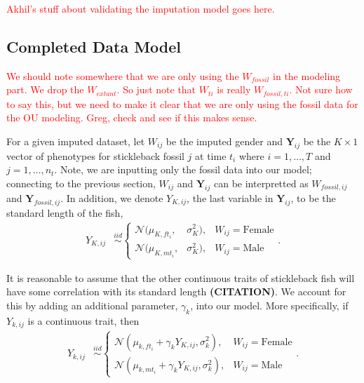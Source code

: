 \documentclass[
  12pt,
]{article}
\begin{document}
\textcolor{red}{Akhil's stuff about validating the imputation model goes here.}

\hypertarget{completed-data-model}{%
\subsection{Completed Data Model}\label{completed-data-model}}

\textcolor{red}{We should note somewhere that we are only using the $W_{fossil}$ in the modeling part.  We drop the $W_{extant}$.  So just note that $W_{ti}$ is really $W_{fossil,ti}$.  Not sure how to say this, but we need to make it clear that we are only using the fossil data for the OU modeling.  Greg, check and see if this makes sense.}

For a given imputed dataset, let \(W_{ij}\) be the imputed gender and
\(\boldsymbol{Y}_{ij}\) be the \(K \times 1\) vector of phenotypes for
stickleback fossil \(j\) at time \(t_i\) where \(i = 1, \ldots, T\) and
\(j = 1,\ldots,n_{t}\). Note, we are inputting only the fossil data into
our model; connecting to the previous section, \(W_{ij}\) and
\(\boldsymbol{Y}_{ij}\) can be interpretted as \(W_{fossil,ij}\) and
\(\boldsymbol{Y}_{fossil,ij}\). In addition, we denote \(Y_{K,ij}\), the
last variable in \(\boldsymbol{Y}_{ij}\), to be the standard length of
the fish, \begin{align}
{Y}_{K,ij} & \overset{iid}{\sim}\left\{\begin{array}{lll} \mathcal{N}(\mu_{K,ft_i},&\sigma_{K}^2), & W_{ij} = \text{Female} \\ \mathcal{N}(\mu_{K,mt_i},&\sigma_{K}^2), & W_{ij} = \text{Male} \end{array}\right..
\label{eq:stl}
\end{align}

It is reasonable to assume that the other continuous traits of
stickleback fish will have some correlation with its standard length
\textbf{(CITATION)}. We account for this by adding an additional
parameter, \(\gamma_k\), into our model. More specifically, if
\(Y_{k,ij}\) is a continuous trait, then \begin{align}
{Y}_{k,ij} & \overset{iid}{\sim}\left\{\begin{array}{llll} \mathcal{N}(\mu_{k,ft_i} + \gamma_kY_{K,ij},\sigma_k^2), & W_{ij} = \text{Female} \\ \mathcal{N}(\mu_{k,mt_i} + \gamma_kY_{K,ij},\sigma_k^2), & W_{ij} = \text{Male} \end{array}\right..
\label{eq:cont}
\end{align}
\end{document}
